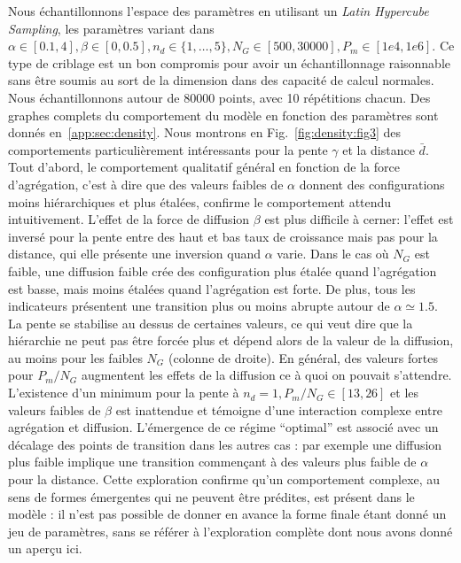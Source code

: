 {Nous échantillonnons l'espace des paramètres en utilisant un \emph{Latin Hypercube Sampling}, les paramètres variant dans $\alpha \in [0.1,4],\beta \in [0,0.5],n_d \in \{1,\ldots , 5\}, N_G \in [500,30000], P_m \in [1e4,1e6]$. Ce type de criblage est un bon compromis pour avoir un échantillonnage raisonnable sans être soumis au sort de la dimension dans des capacité de calcul normales. Nous échantillonnons autour de 80000 points, avec 10 répétitions chacun. Des graphes complets du comportement du modèle en fonction des paramètres sont donnés en~\ref{app:sec:density}. Nous montrons en Fig.~\ref{fig:density:fig3} des comportements particulièrement intéressants pour la pente $\gamma$ et la distance $\bar{d}$. Tout d'abord, le comportement qualitatif général en fonction de la force d'agrégation, c'est à dire que des valeurs faibles de $\alpha$ donnent des configurations moins hiérarchiques et plus étalées, confirme le comportement attendu intuitivement. L'effet de la force de diffusion $\beta$ est plus difficile à cerner: l'effet est inversé pour la pente entre des haut et bas taux de croissance mais pas pour la distance, qui elle présente une inversion quand $\alpha$ varie. Dans le cas où $N_G$ est faible, une diffusion faible crée des configuration plus étalée quand l'agrégation est basse, mais moins étalées quand l'agrégation est forte. De plus, tous les indicateurs présentent une transition plus ou moins abrupte autour de $\alpha \simeq 1.5$. La pente se stabilise au dessus de certaines valeurs, ce qui veut dire que la hiérarchie ne peut pas être forcée plus et dépend alors de la valeur de la diffusion, au moins pour les faibles $N_G$ (colonne de droite). En général, des valeurs fortes pour $P_m/N_G$ augmentent les effets de la diffusion ce à quoi on pouvait s'attendre. L'existence d'un minimum pour la pente à $n_d=1,P_m/N_G\in\left[13,26\right]$ et les valeurs faibles de $\beta$ est inattendue et témoigne d'une interaction complexe entre agrégation et diffusion. L'émergence de ce régime ``optimal'' est associé avec un décalage des points de transition dans les autres cas : par exemple une diffusion plus faible implique une transition commençant à des valeurs plus faible de $\alpha$ pour la distance. Cette exploration confirme qu'un comportement complexe, au sens de formes émergentes qui ne peuvent être prédites, est présent dans le modèle : il n'est pas possible de donner en avance la forme finale étant donné un jeu de paramètres, sans se référer à l'exploration complète dont nous avons donné un aperçu ici.
}



